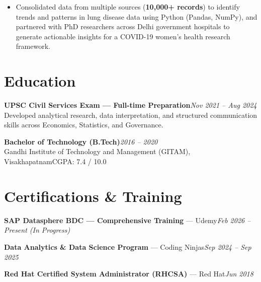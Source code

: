 \documentclass[10pt, letterpaper]{article}
\begin{document}
\begin{itemize}
  \item Consolidated data from multiple sources (\textbf{10,000+ records}) to identify trends and patterns in lung disease data using Python (Pandas, NumPy), and partnered with PhD researchers across Delhi government hospitals to generate actionable insights for a COVID-19 women's health research framework.
\end{itemize}


\section{Education}

{\bfseries UPSC Civil Services Exam — Full-time Preparation}\hfill{\small\color{muted}\textit{Nov 2021 – Aug 2024}}\\
{\small\color{muted}Developed analytical research, data interpretation, and structured communication skills across Economics, Statistics, and Governance.}

\vspace{2pt}
{\bfseries Bachelor of Technology (B.Tech)}\hfill{\small\color{muted}\textit{2016 – 2020}}\\
{\small\color{muted}Gandhi Institute of Technology and Management (GITAM), Visakhapatnam\hfill CGPA: 7.4 / 10.0}

\section{Certifications \& Training}

{\bfseries SAP Datasphere BDC — Comprehensive Training} — Udemy\hfill{\small\color{muted}\textit{Feb 2026 – Present \emph{(In Progress)}}}

\vspace{1pt}
{\bfseries Data Analytics \& Data Science Program} — Coding Ninjas\hfill{\small\color{muted}\textit{Sep 2024 – Sep 2025}}

\vspace{1pt}
{\bfseries Red Hat Certified System Administrator (RHCSA)} — Red Hat\hfill{\small\color{muted}\textit{Jun 2018}}

\end{document}
